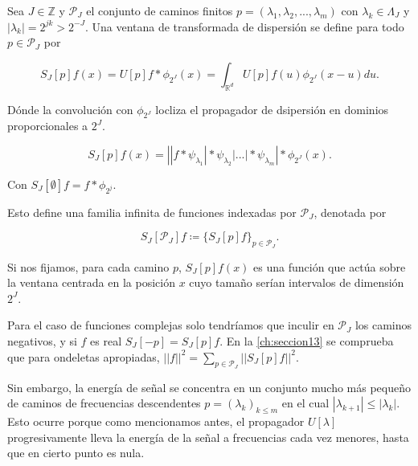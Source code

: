 \begin{definicion}
Sea $J \in \mathbb{Z}$ y $\mathcal{P}_J$ el conjunto de caminos finitos $p=(\lambda_1,\lambda_2,...,\lambda_m)$ con $\lambda_k \in \Lambda_J$ y $|\lambda_k|=2^{jk}>2^{-J}$. Una ventana de transformada de dispersión se define para todo $p \in \mathcal{P}_J$ por

\begin{equation}
  S_J[p]f(x)=U[p]f \ast \phi_{2^J}(x)=\int_{\mathbb{R}^d}U[p]f(u)\phi_{2^J}(x-u)du.
\end{equation}

\noindent Dónde la convolución con $\phi_{2^J}$ locliza el propagador de dsipersión en dominios proporcionales a $2^J$.

\begin{equation}
  S_J[p]f(x)=\left| |f \ast \psi_{\lambda_1} | \ast \psi_{\lambda_2} | ... | \ast \psi_{\lambda_m} \right| \ast \phi_{2^J}(x).
\end{equation}

Con $S_J[\emptyset] f= f \ast \phi_{2^j}$.
\end{definicion}


\noindent Esto define una familia infinita de funciones indexadas por $\mathcal{P}_J$, denotada por

$$S_J[\mathcal{P}_J]f \coloneqq \lbrace S_J[p]f \rbrace_{p\in\mathcal{P}_J}.$$

\medskip

\noindent Si nos fijamos, para cada camino $p$, $S_J[p]f(x)$ es una función que actúa sobre la ventana centrada en la posición $x$ cuyo tamaño serían intervalos de dimensión $2^J$.

\medskip

\noindent Para el caso de funciones complejas solo tendríamos que inculir en $\mathcal{P}_J$ los caminos negativos, y si $f$ es real $S_J[-p]=S_J[p]f$.
\noindent En la \autoref{ch:seccion13} se comprueba que para ondeletas apropiadas, $||f||^2=\sum_{p\in\mathcal{P}_J}\left|\left|S_J[p]f\right|\right|^2$. 

\medskip

\noindent Sin embargo, la energía de señal se concentra en un conjunto mucho más pequeño de caminos de frecuencias descendentes $p=(\lambda_k)_{k\leq m}$ en el cual $|\lambda_{k+1}| \leq |\lambda_k|$. Esto ocurre porque como mencionamos antes, el propagador $U[\lambda]$ progresivamente lleva la energía de la señal a frecuencias cada vez menores, hasta que en cierto punto es nula.

\medskip

